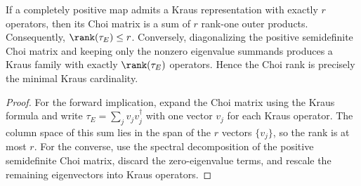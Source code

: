 \begin{remark}
    \label{rem:choi_rank_eq_min_kraus_cardinality}
    \leanok
    If a completely positive map admits a Kraus representation with exactly $r$
    operators, then its Choi matrix is a sum of $r$ rank-one outer products.
    Consequently, $\rank(\tau_E) \le r$.
    Conversely, diagonalizing the positive semidefinite Choi matrix and keeping
    only the nonzero eigenvalue summands produces a Kraus family with exactly
    $\rank(\tau_E)$ operators. Hence the Choi rank is precisely
    the minimal Kraus cardinality.
\end{remark}

\begin{proof}
    \leanok
    For the forward implication, expand the Choi matrix using the Kraus formula
    and write $\tau_E = \sum_j v_j v_j^\dagger$ with one vector $v_j$ for each
    Kraus operator. The column space of this sum lies in the span of the $r$
    vectors $\{v_j\}$, so the rank is at most $r$. For the converse, use the
    spectral decomposition of the positive semidefinite Choi matrix,
    discard the zero-eigenvalue terms, and rescale the remaining eigenvectors
    into Kraus operators.
\end{proof}

